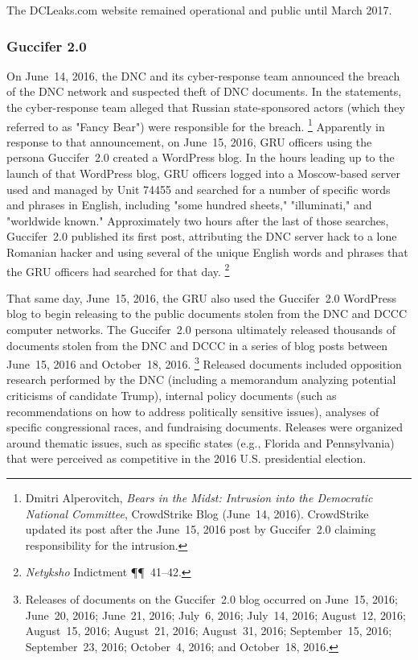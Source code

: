 The DCLeaks.com website remained operational and public until March 2017.

\subsubsection{Guccifer 2.0}

On June~14, 2016, the DNC and its cyber-response team announced the breach of the DNC network and suspected theft of DNC documents.
In the statements, the cyber-response team alleged that Russian state-sponsored actors (which they referred to as "Fancy Bear") were responsible for the breach.%
\footnote{Dmitri Alperovitch, \textit{Bears in the Midst: Intrusion into the Democratic National Committee}, CrowdStrike Blog (June~14, 2016).
CrowdStrike updated its post after the June~15, 2016 post by Guccifer~2.0 claiming responsibility for the intrusion.}
Apparently in response to that announcement, on June~15, 2016, GRU officers using the persona Guccifer~2.0 created a WordPress blog.
In the hours leading up to the launch of that WordPress blog, GRU officers logged into a Moscow-based server used and managed by Unit 74455 and searched for a number of specific words and phrases in English, including "some hundred sheets," "illuminati," and "worldwide known."
Approximately two hours after the last of those searches, Guccifer~2.0 published its first post, attributing the DNC server hack to a lone Romanian hacker and using several of the unique English words and phrases that the GRU officers had searched for that day.%
\footnote{\textit{Netyksho} Indictment \P\P~41--42.}

That same day, June~15, 2016, the GRU also used the Guccifer~2.0 WordPress blog to begin releasing to the public documents stolen from the DNC and DCCC computer networks.
The Guccifer~2.0 persona ultimately released thousands of documents stolen from the DNC and DCCC in a series of blog posts between June~15, 2016 and October~18, 2016.%
\footnote{Releases of documents on the Guccifer~2.0 blog occurred on June~15, 2016;
June~20, 2016;
June~21, 2016;
July~6, 2016;
July~14, 2016;
August~12, 2016;
August~15, 2016;
August~21, 2016;
August~31, 2016;
September~15, 2016;
September~23, 2016;
October~4, 2016;
and October~18, 2016.}
Released documents included opposition research performed by the DNC (including a memorandum analyzing potential criticisms of candidate Trump), internal policy documents (such as recommendations on how to address politically sensitive issues), analyses of specific congressional races, and fundraising documents.
Releases were organized around thematic issues, such as specific states (e.g., Florida and Pennsylvania) that were perceived as competitive in the 2016 U.S. presidential election.

